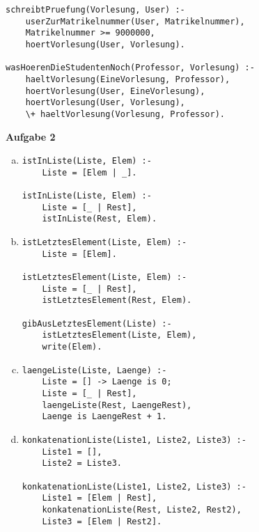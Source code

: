 \documentclass[a4paper,12pt]{article}
\newcommand{\Aufgabe}[1]{
  {
  \vspace*{0.5cm}
  \textsf{\textbf{Aufgabe #1}}
  \vspace*{0.2cm}

  }
}
\begin{document}
\begin{enumerate}[a)]
\begin{verbatim}
schreibtPruefung(Vorlesung, User) :-
    userZurMatrikelnummer(User, Matrikelnummer),
    Matrikelnummer >= 9000000,
    hoertVorlesung(User, Vorlesung).

wasHoerenDieStudentenNoch(Professor, Vorlesung) :-
    haeltVorlesung(EineVorlesung, Professor),
    hoertVorlesung(User, EineVorlesung),
    hoertVorlesung(User, Vorlesung),
    \+ haeltVorlesung(Vorlesung, Professor).
  \end{verbatim}
\end{enumerate}

\Aufgabe{2}

\begin{enumerate}[a)]
  \item \begin{verbatim}
istInListe(Liste, Elem) :-
    Liste = [Elem | _].

istInListe(Liste, Elem) :-
    Liste = [_ | Rest],
    istInListe(Rest, Elem).
  \end{verbatim}
  \item \begin{verbatim}
istLetztesElement(Liste, Elem) :-
    Liste = [Elem].

istLetztesElement(Liste, Elem) :-
    Liste = [_ | Rest],
    istLetztesElement(Rest, Elem).

gibAusLetztesElement(Liste) :-
    istLetztesElement(Liste, Elem),
    write(Elem).
  \end{verbatim}
  \item \begin{verbatim}
laengeListe(Liste, Laenge) :-
    Liste = [] -> Laenge is 0;
    Liste = [_ | Rest],
    laengeListe(Rest, LaengeRest),
    Laenge is LaengeRest + 1.
  \end{verbatim}
  \item \begin{verbatim}
konkatenationListe(Liste1, Liste2, Liste3) :-
    Liste1 = [],
    Liste2 = Liste3.

konkatenationListe(Liste1, Liste2, Liste3) :-
    Liste1 = [Elem | Rest],
    konkatenationListe(Rest, Liste2, Rest2),
    Liste3 = [Elem | Rest2].
  \end{verbatim}
\end{enumerate}
\end{document}
